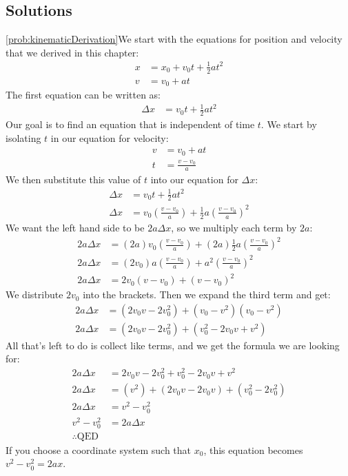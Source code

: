 \subsection{Solutions}
\begin{solution}{\ref{prob:kinematicDerivation}}We start with the equations for position and velocity that we derived in this chapter:
\begin{align*}
x&=x_0+v_0t+\frac{1}{2}at^2\\
v&=v_0+at
\end{align*}
The first equation can be written as:
\begin{align*}
\Delta x&=v_0t+\frac{1}{2}at^2
\end{align*}
Our goal is to find an equation that is independent of time $t$. We start by isolating $t$ in our equation for velocity:
\begin{align*}
v&=v_0+at\\
t&=\frac{v-v_0}{a}
\end{align*}
We then substitute this value of $t$ into our equation for $\Delta x$:
\begin{align*}
\Delta x&=v_0t+\frac{1}{2}at^2\\
\Delta x&=v_0\left(\frac{v-v_0}{a}\right)+\frac{1}{2}a\left(\frac{v-v_0}{a}\right)^2
\end{align*}
We want the left hand side to be $2a\Delta x$, so we multiply each term by $2a$:
\begin{align*}
2a\Delta x&=(2a)v_0\left( \frac{v-v_0}{a}\right) +(2a)\frac{1}{2}a\left( \frac{v-v_0}{a}\right) ^2\\
2a\Delta x&=(2v_0)a\left(\frac{v-v_0}{a}\right)+a^2\left( \frac{v-v_0}{a}\right) ^2\\
2a\Delta x&=2v_0(v-v_0)+(v-v_0)^2
\end{align*}
We distribute $2v_0$ into the brackets. Then we expand the third term and get:
\begin{align*}
2a\Delta x&=(2v_0v-2v_0^2)+(v_0-v^2)(v_0-v^2)\\
2a\Delta x&=(2v_0v-2v_0^2)+(v_0^2-2v_0v+v^2)
\end{align*}
All that's left to do is collect like terms, and we get the formula we are looking for:
\begin{align*}
2a\Delta x&=2v_0v-2v_0^2+v_0^2-2v_0v+v^2\\
2a\Delta x&=(v^2)+(2v_0v-2v_0v)+(v_0^2-2v_0^2)\\
2a\Delta x&=v^2-v_0^2\\
v^2-v_0^2&=2a\Delta x\\
\therefore \text{QED}
\end{align*}
If you choose a coordinate system such that $x_0$, this equation becomes $v^2-v_0^2=2ax$.
\end{solution}

